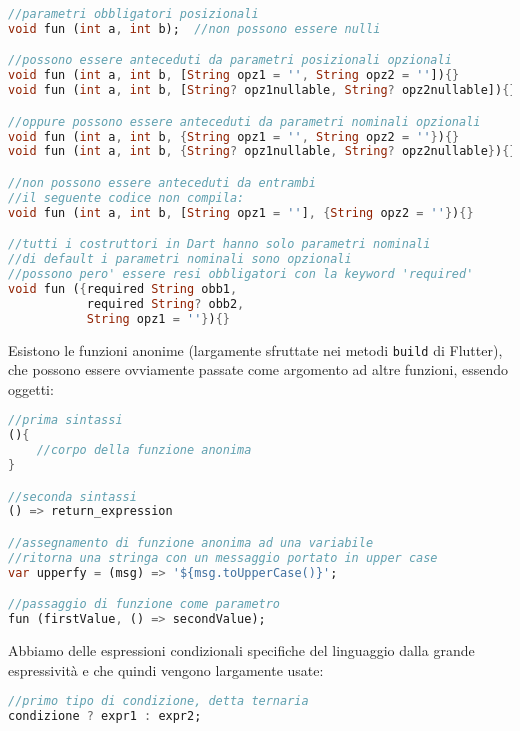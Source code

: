 \begin{appendices}
\begin{lstlisting}[language=dart, firstnumber=1,caption={Dart parametri funzioni}]
//parametri obbligatori posizionali
void fun (int a, int b);  //non possono essere nulli

//possono essere anteceduti da parametri posizionali opzionali
void fun (int a, int b, [String opz1 = '', String opz2 = '']){}
void fun (int a, int b, [String? opz1nullable, String? opz2nullable]){}

//oppure possono essere anteceduti da parametri nominali opzionali
void fun (int a, int b, {String opz1 = '', String opz2 = ''}){}
void fun (int a, int b, {String? opz1nullable, String? opz2nullable}){}

//non possono essere anteceduti da entrambi
//il seguente codice non compila:
void fun (int a, int b, [String opz1 = ''], {String opz2 = ''}){} 

//tutti i costruttori in Dart hanno solo parametri nominali
//di default i parametri nominali sono opzionali
//possono pero' essere resi obbligatori con la keyword 'required'
void fun ({required String obb1, 
           required String? obb2, 
           String opz1 = ''}){}
\end{lstlisting}

Esistono le funzioni anonime (largamente sfruttate nei metodi \verb+build+ di Flutter), che possono essere ovviamente passate come argomento ad altre funzioni, essendo oggetti:

\begin{lstlisting}[language=dart, firstnumber=1,caption={Dart funzioni anonime}]
//prima sintassi
(){
    //corpo della funzione anonima
} 

//seconda sintassi
() => return_expression

//assegnamento di funzione anonima ad una variabile
//ritorna una stringa con un messaggio portato in upper case
var upperfy = (msg) => '${msg.toUpperCase()}';

//passaggio di funzione come parametro
fun (firstValue, () => secondValue);
\end{lstlisting}

Abbiamo delle espressioni condizionali specifiche del linguaggio dalla grande espressività e che quindi vengono largamente usate:

\begin{lstlisting}[language=dart, firstnumber=1,caption={Dart espressioni ternarie}]
//primo tipo di condizione, detta ternaria
condizione ? expr1 : expr2;


\end{lstlisting}
\end{appendices}
